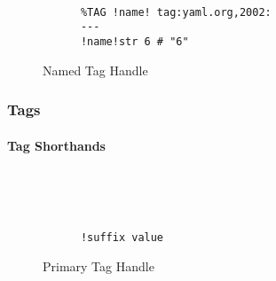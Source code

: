 \documentclass[a4paper, svgnames, 12pt]{article}
\begin{document}
\begin{figure}[H]
  \begin{minipage}[t]{0.48\textwidth}
    \vspace{0pt}
    \begin{bchart}[max=9, width=0.85\textwidth]
    \end{bchart}
  \end{minipage}
  \begin{minipage}[t]{0pt}~\end{minipage}
  \begin{minipage}[t]{0.48\textwidth}
    \vspace{0pt}
    \begin{verbatim}
      %TAG !name! tag:yaml.org,2002:
      ---
      !name!str 6 # "6"
    \end{verbatim}
  \end{minipage}
  \caption{Named Tag Handle}
\end{figure}

\subsubsection{Tags}

\paragraph{Tag Shorthands}~\\

\begin{figure}[H]
  \begin{minipage}[t]{0.48\textwidth}
    \vspace{0pt}
    \begin{bchart}[max=9, width=0.85\textwidth]
      \bcxlabel{}
    \end{bchart}
  \end{minipage}
  \begin{minipage}[t]{0pt}~\end{minipage}
  \begin{minipage}[t]{0.48\textwidth}
    \vspace{0pt}
    \begin{verbatim}
      !suffix value
    \end{verbatim}
  \end{minipage}
  \caption{Primary Tag Handle}
\end{figure}
\end{document}
